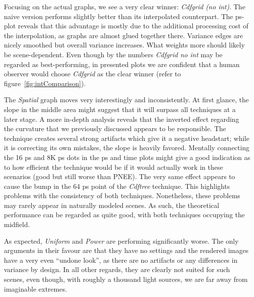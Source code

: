 Focusing on the actual graphs, we see a very clear winner: \textit{Cdfgrid (no int)}. The naive version performs slightly better than its interpolated counterpart. The ps-plot reveals that this advantage is mostly due to the additional processing cost of the interpolation, as graphs are almost glued together there. Variance edges are nicely smoothed but overall variance increases. What weights more should likely be scene-dependent. Even though by the numbers \textit{Cdfgrid no int} may be regarded as best-performing, in presented plots we are confident that a human observer would choose \textit{Cdfgrid} as the clear winner (refer to figure~\ref{fig:intComparison}).

The \textit{Spatial} graph moves very interestingly and inconsistently. At first glance, the slope in the middle area might suggest that it will surpass all techniques at a later stage. A more in-depth analysis reveals that the inverted effect regarding the curvature that we previously discussed appears to be responsible. The technique creates several strong artifacts which give it a negative headstart; while it is correcting its own mistakes, the slope is heavily favored. Mentally connecting the 16 ps and 8K ps dots in the ps and time plots might give a good indication as to how efficient the technique would be if it would actually work in these scenarios (good but still worse than PNEE). The very same effect appears to cause the bump in the 64 ps point of the \textit{Cdftree} technique. This highlights problems with the consistency of both techniques. Nonetheless, these problems may rarely appear in naturally modeled scenes. As such, the theoretical performance can be regarded as quite good, with both techniques occupying the midfield. 

As expected, \textit{Uniform} and \textit{Power} are performing significantly worse. The only arguments in their favour are that they have no settings and the rendered images have a very even \enquote{undone look}, as there are no artifacts or any differences in variance by design. In all other regards, they are clearly not suited for such scenes, even though, with roughly a thousand light sources, we are far away from imaginable extremes.

